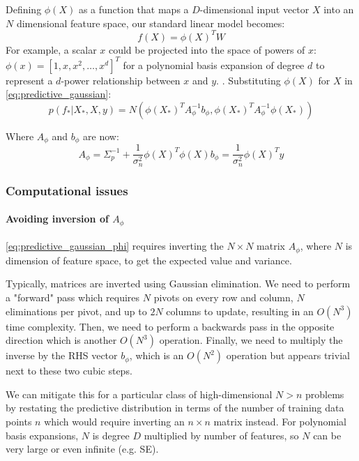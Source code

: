 Defining $\phi(X)$ as a function that maps a $D$-dimensional input vector $X$ into an $N$ dimensional feature space, our standard linear model becomes:
\begin{equation*}
    f(X) = \phi(X)^T W
\end{equation*}
For example, a scalar $x$ could be projected into the space of powers of $x$: $\phi(x) = [1, x, x^2, \ldots, x^d]^T$ for a polynomial basis expansion of degree $d$ to represent a $d$-power relationship between $x$ and $y$.
.
Substituting $\phi(X)$ for $X$ in \ref{eq:predictive_gaussian}:
\begin{equation} \label{eq:predictive_gaussian_phi}
    p(f_*|X_*,X,y) = N(\phi(X_*)^TA_{\phi}^{-1}b_{\phi} , \phi(X_*)^TA_{\phi}^{-1}\phi(X_*))
\end{equation}

Where $A_{\phi}$ and $b_{\phi}$ are now:
\begin{equation*}
    A_{\phi} = \Sigma_p^{-1} + \frac{1}{\sigma^2_n}\phi(X)^T\phi(X)
    b_{\phi} = \frac{1}{\sigma^2_n}\phi(X)^Ty
\end{equation*}

\subsubsection{Computational issues}
\paragraph{Avoiding inversion of $A_{\phi}$}
\ref{eq:predictive_gaussian_phi} requires inverting the $N \times N$ matrix $A_{\phi}$, where $N$ is dimension of feature space, to get the expected value and variance. 

Typically, matrices are inverted using Gaussian elimination. We need to perform a "forward" pass which requires $N$ pivots on every row and column, $N$ eliminations per pivot, and up to $2N$ columns to update, resulting in an $O(N^3)$ time complexity. Then, we need to perform a backwards pass in the opposite direction which is another $O(N^3)$ operation. Finally, we need to multiply the inverse by the RHS vector $b_{\phi}$, which is an $O(N^2)$ operation but appears trivial next to these two cubic steps. 

We can mitigate this for a particular class of high-dimensional $N > n$ problems by restating the predictive distribution in terms of the number of training data points $n$ which would require inverting an $n \times n$ matrix instead. For polynomial basis expansions, $N$ is degree $D$ multiplied by number of features, so $N$ can be very large or even infinite (e.g. SE). %

